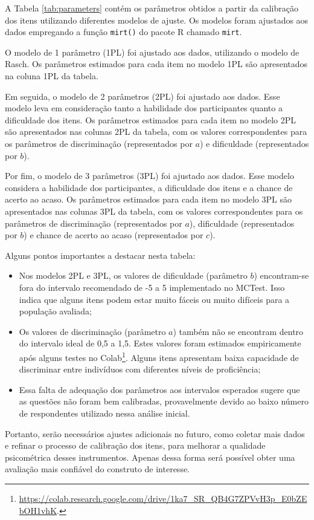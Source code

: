 A Tabela \ref{tab:parameters} contém os parâmetros obtidos a partir da calibração dos itens utilizando diferentes modelos de ajuste. Os modelos foram ajustados aos dados empregando a função \verb|mirt()| do pacote R chamado \verb|mirt|.

O modelo de 1 parâmetro (1PL) foi ajustado aos dados, utilizando o modelo de Rasch. Os parâmetros estimados para cada item no modelo 1PL são apresentados na coluna 1PL da tabela.

Em seguida, o modelo de 2 parâmetros (2PL) foi ajustado aos dados. Esse modelo leva em consideração tanto a habilidade dos participantes quanto a dificuldade dos itens. Os parâmetros estimados para cada item no modelo 2PL são apresentados nas colunas 2PL da tabela, com os valores correspondentes para os parâmetros de discriminação (representados por $a$) e dificuldade (representados por $b$).

Por fim, o modelo de 3 parâmetros (3PL) foi ajustado aos dados. Esse modelo considera a habilidade dos participantes, a dificuldade dos itens e a chance de acerto ao acaso. Os parâmetros estimados para cada item no modelo 3PL são apresentados nas colunas 3PL da tabela, com os valores correspondentes para os parâmetros de discriminação (representados por $a$), dificuldade (representados por $b$) e chance de acerto ao acaso (representados por $c$).

Alguns pontos importantes a destacar nesta tabela:
\begin{itemize}
    \item Nos modelos 2PL e 3PL, os valores de dificuldade (parâmetro $b$) encontram-se fora do intervalo recomendado de -5 a 5 implementado no MCTest. Isso indica que alguns itens podem estar muito fáceis ou muito difíceis para a população avaliada;
    \item Os valores de discriminação (parâmetro $a$) também não se encontram dentro do intervalo ideal de 0,5 a 1,5. Estes valores foram estimados empiricamente após alguns testes no Colab\footnote{\url{https://colab.research.google.com/drive/1ka7_SR_QB4G7ZPVvH3p_E0bZEbOH1vhK}.}. Alguns itens apresentam baixa capacidade de discriminar entre indivíduos com diferentes níveis de proficiência;
    \item Essa falta de adequação dos parâmetros aos intervalos esperados sugere que as questões não foram bem calibradas, provavelmente devido ao baixo número de respondentes utilizado nessa análise inicial.
\end{itemize}
Portanto, serão necessários ajustes adicionais no futuro, como coletar mais dados e refinar o processo de calibração dos itens, para melhorar a qualidade psicométrica desses instrumentos. Apenas dessa forma será possível obter uma avaliação mais confiável do construto de interesse.

